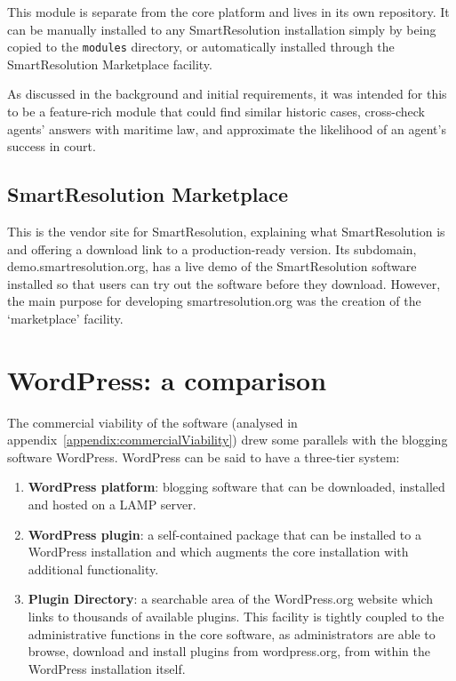 This module is separate from the core platform and lives in its own repository. It can be manually installed to any SmartResolution installation simply by being copied to the \lstinline{modules} directory, or automatically installed through the SmartResolution Marketplace facility.

As discussed in the background and initial requirements, it was intended for this to be a feature-rich module that could find similar historic cases, cross-check agents' answers with maritime law, and approximate the likelihood of an agent's success in court.

\subsection{SmartResolution Marketplace}

This is the vendor site for SmartResolution, explaining what SmartResolution is and offering a download link to a production-ready version. Its subdomain, demo.smartresolution.org, has a live demo of the SmartResolution software installed so that users can try out the software before they download. However, the main purpose for developing smartresolution.org was the creation of the `marketplace' facility.

\section{WordPress: a comparison}

The commercial viability of the software (analysed in appendix~\ref{appendix:commercialViability}) drew some parallels with the blogging software WordPress. WordPress can be said to have a three-tier system:

\begin{enumerate}
    \item \textbf{WordPress platform}: blogging software that can be downloaded, installed and hosted on a LAMP server.

    \item \textbf{WordPress plugin}: a self-contained package that can be installed to a WordPress installation and which augments the core installation with additional functionality.

    \item \textbf{Plugin Directory}: a searchable area of the WordPress.org website which links to thousands of available plugins. This facility is tightly coupled to the administrative functions in the core software, as administrators are able to browse, download and install plugins from wordpress.org, from within the WordPress installation itself.
\end{enumerate}


